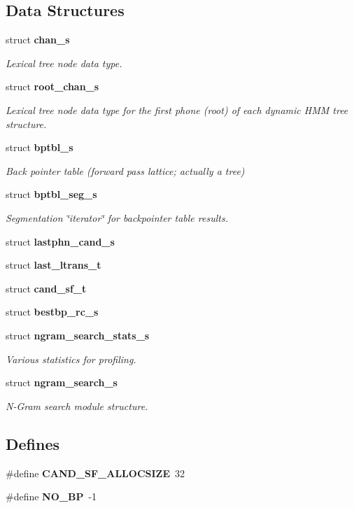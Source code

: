 \subsection*{\-Data \-Structures}
\begin{DoxyCompactItemize}
\item 
struct {\bf chan\-\_\-s}
\begin{DoxyCompactList}\small\item\em \-Lexical tree node data type. \end{DoxyCompactList}\item 
struct {\bf root\-\_\-chan\-\_\-s}
\begin{DoxyCompactList}\small\item\em \-Lexical tree node data type for the first phone (root) of each dynamic \-H\-M\-M tree structure. \end{DoxyCompactList}\item 
struct {\bf bptbl\-\_\-s}
\begin{DoxyCompactList}\small\item\em \-Back pointer table (forward pass lattice; actually a tree) \end{DoxyCompactList}\item 
struct {\bf bptbl\-\_\-seg\-\_\-s}
\begin{DoxyCompactList}\small\item\em \-Segmentation \char`\"{}iterator\char`\"{} for backpointer table results. \end{DoxyCompactList}\item 
struct {\bf lastphn\-\_\-cand\-\_\-s}
\item 
struct {\bf last\-\_\-ltrans\-\_\-t}
\item 
struct {\bf cand\-\_\-sf\-\_\-t}
\item 
struct {\bf bestbp\-\_\-rc\-\_\-s}
\item 
struct {\bf ngram\-\_\-search\-\_\-stats\-\_\-s}
\begin{DoxyCompactList}\small\item\em \-Various statistics for profiling. \end{DoxyCompactList}\item 
struct {\bf ngram\-\_\-search\-\_\-s}
\begin{DoxyCompactList}\small\item\em \-N-\/\-Gram search module structure. \end{DoxyCompactList}\end{DoxyCompactItemize}
\subsection*{\-Defines}
\begin{DoxyCompactItemize}
\item 
\#define {\bfseries \-C\-A\-N\-D\-\_\-\-S\-F\-\_\-\-A\-L\-L\-O\-C\-S\-I\-Z\-E}~32\label{ngram__search_8h_a346ebebfc9fdaefced106c1560667ac0}

\item 
\#define {\bfseries \-N\-O\-\_\-\-B\-P}~-\/1\label{ngram__search_8h_a10e17daabad292e65cac7099c3678660}

\end{DoxyCompactItemize}
